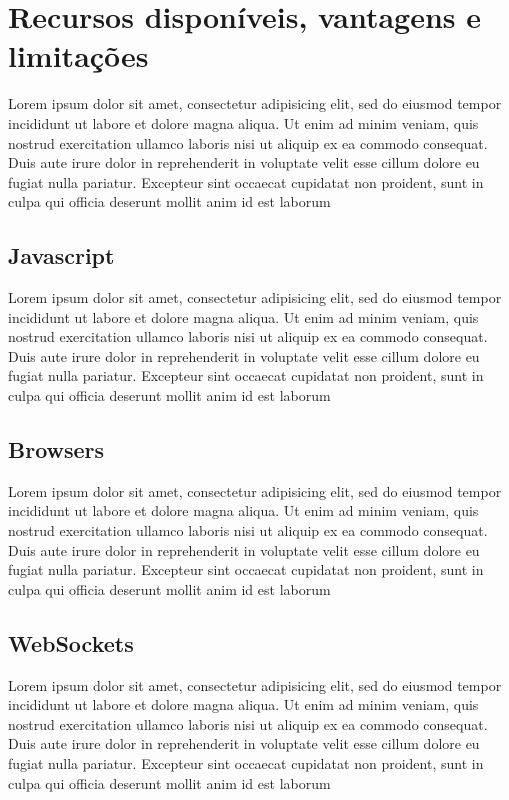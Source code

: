 \section{Recursos disponíveis, vantagens e limitações}

\cite{whatwg01}
\cite{html5mozilla}
\cite{phan2010mobile}
\cite{hawkes2011foundation}
Lorem ipsum dolor sit amet, consectetur adipisicing elit, sed do eiusmod tempor incididunt ut labore et dolore magna aliqua. Ut enim ad minim veniam, quis nostrud exercitation ullamco laboris nisi ut aliquip ex ea commodo consequat. Duis aute irure dolor in reprehenderit in voluptate velit esse cillum dolore eu fugiat nulla pariatur.  Excepteur sint occaecat cupidatat non proident, sunt in culpa qui officia deserunt mollit anim id est laborum

\subsection{Javascript}

Lorem ipsum dolor sit amet, consectetur adipisicing elit, sed do eiusmod tempor incididunt ut labore et dolore magna aliqua. Ut enim ad minim veniam, quis nostrud exercitation ullamco laboris nisi ut aliquip ex ea commodo consequat. Duis aute irure dolor in reprehenderit in voluptate velit esse cillum dolore eu fugiat nulla pariatur.  Excepteur sint occaecat cupidatat non proident, sunt in culpa qui officia deserunt mollit anim id est laborum

\subsection{Browsers}

\cite{browserscope}
Lorem ipsum dolor sit amet, consectetur adipisicing elit, sed do eiusmod tempor incididunt ut labore et dolore magna aliqua. Ut enim ad minim veniam, quis nostrud exercitation ullamco laboris nisi ut aliquip ex ea commodo consequat. Duis aute irure dolor in reprehenderit in voluptate velit esse cillum dolore eu fugiat nulla pariatur.  Excepteur sint occaecat cupidatat non proident, sunt in culpa qui officia deserunt mollit anim id est laborum

\subsection{WebSockets}

Lorem ipsum dolor sit amet, consectetur adipisicing elit, sed do eiusmod tempor incididunt ut labore et dolore magna aliqua. Ut enim ad minim veniam, quis nostrud exercitation ullamco laboris nisi ut aliquip ex ea commodo consequat. Duis aute irure dolor in reprehenderit in voluptate velit esse cillum dolore eu fugiat nulla pariatur.  Excepteur sint occaecat cupidatat non proident, sunt in culpa qui officia deserunt mollit anim id est laborum

